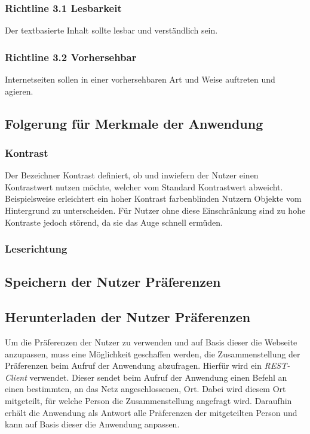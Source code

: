\documentclass[12pt, paper=a4, bibtotoc, toc=listof, headsepline=true]{scrreprt}
\begin{document}
			\subsubsection{Richtline 3.1 Lesbarkeit}
			Der textbasierte Inhalt sollte lesbar und verständlich sein.
			\subsubsection{Richtline 3.2 Vorhersehbar}
			Internetseiten sollen in einer vorhersehbaren Art und Weise auftreten und agieren.
			\cite[vgl.]{wcag}
		\subsection{Folgerung für Merkmale der Anwendung}
			\subsubsection{Kontrast}
			Der Bezeichner Kontrast definiert, ob und inwiefern der Nutzer einen Kontrastwert nutzen möchte, welcher vom Standard Kontrastwert abweicht. Beispielsweise erleichtert ein hoher Kontrast farbenblinden Nutzern Objekte vom Hintergrund zu unterscheiden. Für Nutzer ohne diese Einschränkung sind zu hohe Kontraste jedoch störend, da sie das Auge schnell ermüden.\cite{balzert2009webdesign}
			\subsubsection{Leserichtung}

		\subsection{Speichern der Nutzer Präferenzen}
		\subsection{Herunterladen der Nutzer Präferenzen}
		Um die Präferenzen der Nutzer zu verwenden und auf Basis dieser die Webseite anzupassen, muss eine Möglichkeit geschaffen werden, die Zusammenstellung der Präferenzen beim Aufruf der Anwendung abzufragen. Hierfür wird ein \emph{REST-Client} verwendet. Dieser sendet beim Aufruf der Anwendung einen Befehl an einen bestimmten, an das Netz angeschlossenen, Ort. Dabei wird diesem Ort mitgeteilt, für welche Person die Zusammenstellung angefragt wird. Daraufhin erhält die Anwendung als Antwort alle Präferenzen der mitgeteilten Person und kann auf Basis dieser die Anwendung anpassen.
\end{document}
